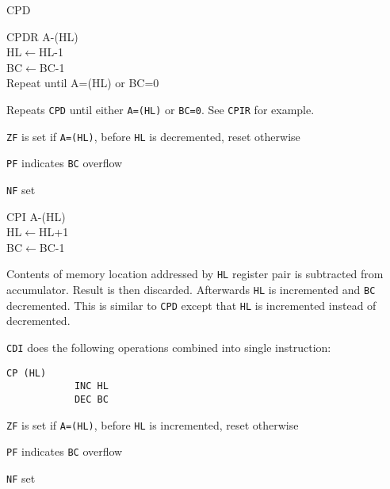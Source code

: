 \documentclass[twoside,openright,a4paper]{book}
\begin{document}
\begin{basedescript}{
	\desclabelstyle{\multilinelabel}
	\desclabelwidth{3cm}}
\begin{detailitem}{CPD}
		\begin{DetailTiming}
		\end{DetailTiming}

	\end{detailitem}

	\pagebreak
	\begin{detailitem}{CPDR}
		{A-(HL)\\
		HL$\leftarrow$HL-1\\
		BC$\leftarrow$BC-1\\
		Repeat until A=(HL) or BC=0}

		Repeats {\tt CPD} until either {\tt A=(HL)} or {\tt BC=0}. See {\tt CPIR} for example.

		\begin{DetailEffects}
			\item {\tt ZF} is set if {\tt A=(HL)}, before {\tt HL} is decremented, reset otherwise
			\item {\tt PF} indicates {\tt BC} overflow
			\item {\tt NF} set
		\end{DetailEffects}
				
		\begin{DetailTiming}
			\DetailTime{BC=0$\wedge$A=(HL)}{4}{16}
			\DetailTime{BC$\not=$0$\vee$A$\not=$(HL)}{5}{21}
		\end{DetailTiming}

	\end{detailitem}

	\begin{detailitem}{CPI}
		{A-(HL)\\
		HL$\leftarrow$HL+1\\
		BC$\leftarrow$BC-1}

		Contents of memory location addressed by {\tt HL} register pair is subtracted from accumulator. Result is then discarded. Afterwards {\tt HL} is incremented and {\tt BC} decremented. This is similar to {\tt CPD} except that {\tt HL} is incremented instead of decremented.

		{\tt CDI} does the following operations combined into single instruction:

		\begin{Verbatim}[gobble=3]
			CP (HL)
			INC HL
			DEC BC
		\end{Verbatim}
	
		\begin{DetailEffects}
			\item {\tt ZF} is set if {\tt A=(HL)}, before {\tt HL} is incremented, reset otherwise
			\item {\tt PF} indicates {\tt BC} overflow
			\item {\tt NF} set
		\end{DetailEffects}
		

\end{detailitem}
\end{basedescript}
\end{document}
